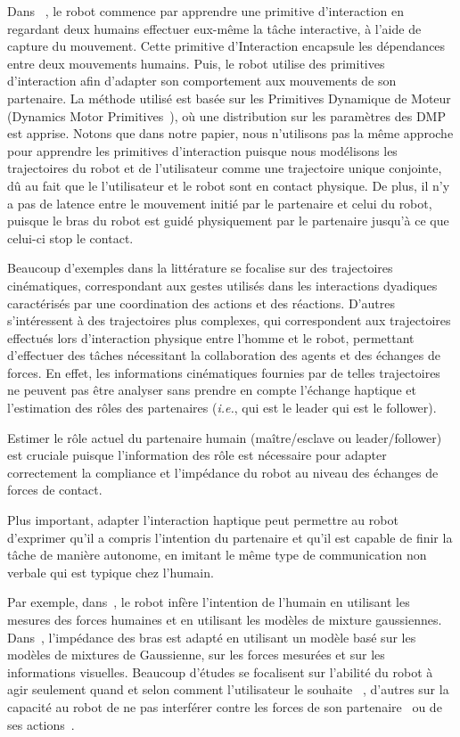 \documentclass[utf8]{frontiersSCNS} %
\newcommand{\todo}[1]{\textcolor{red}{\textbf{/*#1*/}}}
\begin{document}
Dans ~\citep{amor2014interaction}, le robot commence par apprendre une primitive d'interaction en regardant deux humains effectuer eux-même la tâche interactive, à l'aide de capture du mouvement. Cette primitive d'Interaction encapsule les dépendances entre deux mouvements humains. Puis, le robot utilise des primitives d'interaction afin d'adapter son comportement aux mouvements de son partenaire. La méthode utilisé est basée sur les Primitives Dynamique de Moteur (Dynamics Motor Primitives~\citep{ijspeert2013dynamical}), où une distribution sur les paramètres des DMP est apprise. Notons que dans notre papier, nous n'utilisons pas la même approche pour apprendre les primitives d'interaction puisque nous modélisons les trajectoires du robot et de l’utilisateur comme une trajectoire unique conjointe, dû au fait que le l'utilisateur et le robot sont en contact physique. De plus, il n'y a pas de latence entre le mouvement initié par le partenaire et celui du robot, puisque le bras du robot est guidé physiquement par le partenaire jusqu'à ce que celui-ci stop le contact.

Beaucoup d'exemples dans la littérature se focalise sur des trajectoires cinématiques, correspondant aux gestes utilisés dans les interactions dyadiques caractérisés par une coordination des actions et des réactions. D'autres s’intéressent à des trajectoires plus complexes, qui correspondent aux trajectoires effectués lors d'interaction physique entre l'homme et le robot, permettant d'effectuer des tâches nécessitant la collaboration des agents et des échanges de forces. En effet, les informations cinématiques fournies par de telles trajectoires ne peuvent pas être analyser sans prendre en compte l’échange haptique et l'estimation des rôles des partenaires (\textit{i.e.}, qui est le leader qui est le follower).

Estimer le rôle actuel du partenaire humain (maître/esclave ou leader/follower) est cruciale puisque l'information des rôle est nécessaire pour adapter correctement la compliance  et l’impédance du robot au niveau des échanges de forces de contact.

Plus important, adapter l'interaction haptique peut permettre au robot d'exprimer qu'il a compris l'intention du partenaire et qu'il est capable de finir la tâche de manière autonome, en imitant le même type de communication non verbale qui est typique chez l'humain.

Par exemple, dans~\citep{gribovskaya2011motion}, le robot infère l'intention de l'humain en utilisant les mesures des forces humaines et en utilisant les modèles de mixture gaussiennes.
Dans~\citep{rozo2013learning}, l'impédance des bras est adapté en utilisant un modèle basé sur les modèles de mixtures de Gaussienne, sur les forces mesurées  et sur les informations visuelles.
Beaucoup d’études se focalisent sur l'abilité du robot à agir seulement quand et selon comment l'utilisateur le souhaite~\citep{carlson2008human}\citep{soh2015learning} , d'autres sur la capacité au robot de ne pas interférer contre les forces de son partenaire~\citep{jarrasse2008can} ou de ses actions~\citep{baraglia2016initiative}.
\end{document}
